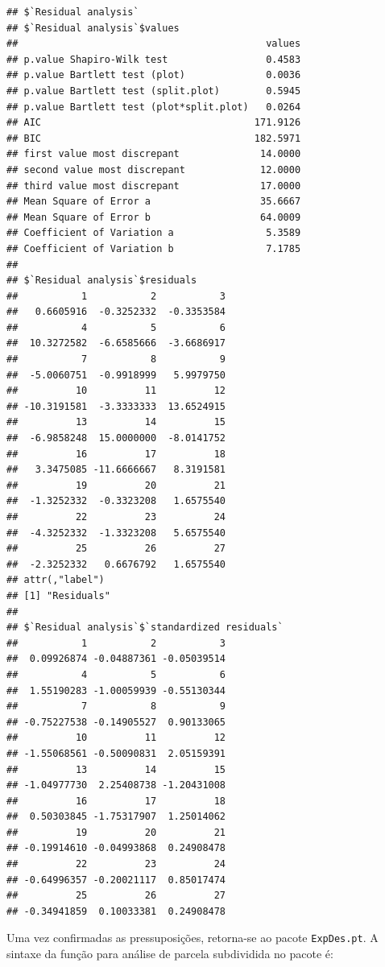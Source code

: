 \documentclass[
]{article}
\begin{document}
\begin{verbatim}
## $`Residual analysis`
## $`Residual analysis`$values
##                                           values
## p.value Shapiro-Wilk test                 0.4583
## p.value Bartlett test (plot)              0.0036
## p.value Bartlett test (split.plot)        0.5945
## p.value Bartlett test (plot*split.plot)   0.0264
## AIC                                     171.9126
## BIC                                     182.5971
## first value most discrepant              14.0000
## second value most discrepant             12.0000
## third value most discrepant              17.0000
## Mean Square of Error a                   35.6667
## Mean Square of Error b                   64.0009
## Coefficient of Variation a                5.3589
## Coefficient of Variation b                7.1785
## 
## $`Residual analysis`$residuals
##           1           2           3 
##   0.6605916  -0.3252332  -0.3353584 
##           4           5           6 
##  10.3272582  -6.6585666  -3.6686917 
##           7           8           9 
##  -5.0060751  -0.9918999   5.9979750 
##          10          11          12 
## -10.3191581  -3.3333333  13.6524915 
##          13          14          15 
##  -6.9858248  15.0000000  -8.0141752 
##          16          17          18 
##   3.3475085 -11.6666667   8.3191581 
##          19          20          21 
##  -1.3252332  -0.3323208   1.6575540 
##          22          23          24 
##  -4.3252332  -1.3323208   5.6575540 
##          25          26          27 
##  -2.3252332   0.6676792   1.6575540 
## attr(,"label")
## [1] "Residuals"
## 
## $`Residual analysis`$`standardized residuals`
##           1           2           3 
##  0.09926874 -0.04887361 -0.05039514 
##           4           5           6 
##  1.55190283 -1.00059939 -0.55130344 
##           7           8           9 
## -0.75227538 -0.14905527  0.90133065 
##          10          11          12 
## -1.55068561 -0.50090831  2.05159391 
##          13          14          15 
## -1.04977730  2.25408738 -1.20431008 
##          16          17          18 
##  0.50303845 -1.75317907  1.25014062 
##          19          20          21 
## -0.19914610 -0.04993868  0.24908478 
##          22          23          24 
## -0.64996357 -0.20021117  0.85017474 
##          25          26          27 
## -0.34941859  0.10033381  0.24908478
\end{verbatim}

Uma vez confirmadas as pressuposições, retorna-se ao pacote \texttt{ExpDes.pt}. A sintaxe da função para análise de parcela subdividida no pacote é:
\end{document}
